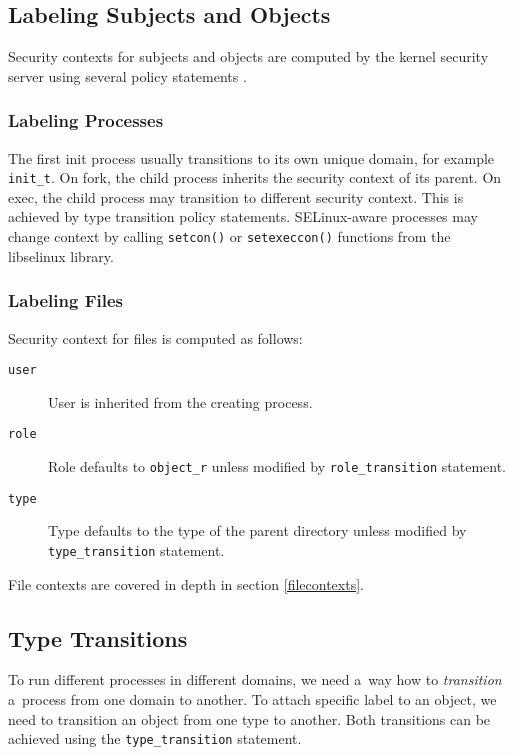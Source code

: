 \subsection{Labeling Subjects and Objects}
Security contexts for subjects and objects are computed by the kernel security
server using several policy statements \cite[pp.~31--33]{tsn}.

\subsubsection{Labeling Processes}
The first init process usually transitions to its own unique domain, for example
\texttt{init\_t}. On fork, the child process inherits the security context of
its parent. On exec, the child process may transition to different security
context. This is achieved by type transition policy statements. SELinux-aware
processes may change context by calling \texttt{setcon()} or
\texttt{setexeccon()} functions from the libselinux library.

\subsubsection{Labeling Files}
Security context for files is computed as follows:
\begin{description}
    \item [\texttt{user}] User is inherited from the creating process.
    \item [\texttt{role}] Role defaults to \texttt{object\_r} unless modified by
        \texttt{role\_transition} statement.
    \item [\texttt{type}] Type defaults to the type of the parent directory
        unless modified by \texttt{type\_transition} statement.
\end{description}
File contexts are covered in depth in section \ref{filecontexts}.

\subsection{Type Transitions}
\label{typetransitions}
To run different processes in different domains, we need a~way how to
\emph{transition} a~process from one domain to another. To attach specific label
to an object, we need to transition an object from one type to another. Both
transitions can be achieved using the \texttt{type\_transition} statement.

